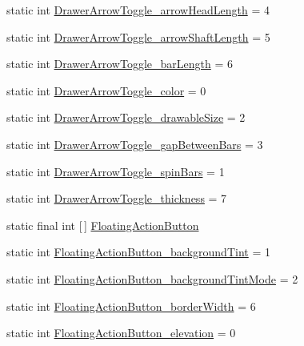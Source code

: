 \begin{DoxyCompactItemize}
static int \hyperlink{classandroid_1_1support_1_1v4_1_1R_1_1styleable_a23a9c7acda0be283d52e3f0e07fb0a97}{Drawer\+Arrow\+Toggle\+\_\+arrow\+Head\+Length} = 4
\item 
static int \hyperlink{classandroid_1_1support_1_1v4_1_1R_1_1styleable_ab53d0e29cd65acb145c6d9782b331b94}{Drawer\+Arrow\+Toggle\+\_\+arrow\+Shaft\+Length} = 5
\item 
static int \hyperlink{classandroid_1_1support_1_1v4_1_1R_1_1styleable_a4f8d98b05b91ea2e7981c8af25395159}{Drawer\+Arrow\+Toggle\+\_\+bar\+Length} = 6
\item 
static int \hyperlink{classandroid_1_1support_1_1v4_1_1R_1_1styleable_ace7c2b30ab349131726e0b7a4ea67103}{Drawer\+Arrow\+Toggle\+\_\+color} = 0
\item 
static int \hyperlink{classandroid_1_1support_1_1v4_1_1R_1_1styleable_a4c53abe96194151c3a62076cc72f6048}{Drawer\+Arrow\+Toggle\+\_\+drawable\+Size} = 2
\item 
static int \hyperlink{classandroid_1_1support_1_1v4_1_1R_1_1styleable_ae17bd4d67410b191b674e1359e019598}{Drawer\+Arrow\+Toggle\+\_\+gap\+Between\+Bars} = 3
\item 
static int \hyperlink{classandroid_1_1support_1_1v4_1_1R_1_1styleable_a59eac02900e4f8c75b5cef8e7f80ef10}{Drawer\+Arrow\+Toggle\+\_\+spin\+Bars} = 1
\item 
static int \hyperlink{classandroid_1_1support_1_1v4_1_1R_1_1styleable_a1be933a91500d201cebc19118e4160bf}{Drawer\+Arrow\+Toggle\+\_\+thickness} = 7
\item 
static final int \mbox{[}$\,$\mbox{]} \hyperlink{classandroid_1_1support_1_1v4_1_1R_1_1styleable_ad3363bb32f8e5e0dde36b5e32146816b}{Floating\+Action\+Button}
\item 
static int \hyperlink{classandroid_1_1support_1_1v4_1_1R_1_1styleable_aeb7656d79670be2f4574c32fe5d56324}{Floating\+Action\+Button\+\_\+background\+Tint} = 1
\item 
static int \hyperlink{classandroid_1_1support_1_1v4_1_1R_1_1styleable_aee1803929827518ab119257a16d76e6d}{Floating\+Action\+Button\+\_\+background\+Tint\+Mode} = 2
\item 
static int \hyperlink{classandroid_1_1support_1_1v4_1_1R_1_1styleable_acfbadae3c3154a5b70a3e70615553f1c}{Floating\+Action\+Button\+\_\+border\+Width} = 6
\item 
static int \hyperlink{classandroid_1_1support_1_1v4_1_1R_1_1styleable_a9d53e5c6b5c18f38915b509ebada1d58}{Floating\+Action\+Button\+\_\+elevation} = 0
\item 

\end{DoxyCompactItemize}
